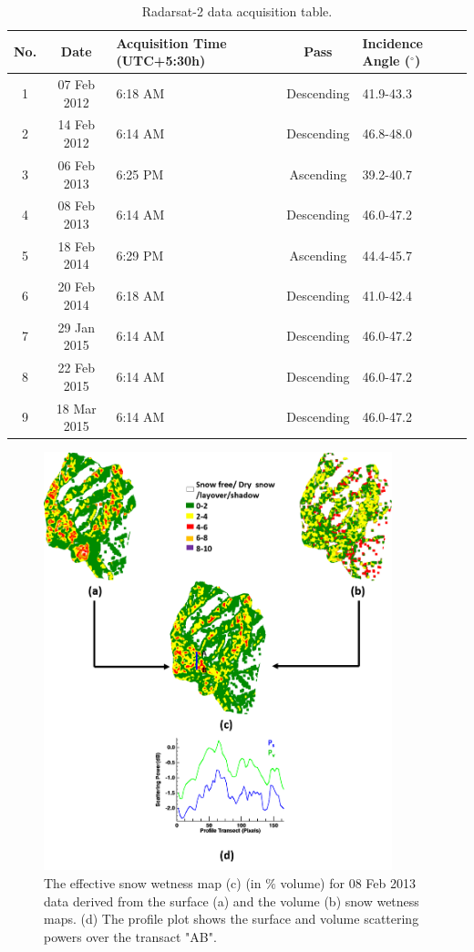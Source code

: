 \begin{table}[!h]
	\caption{Radarsat-2 data acquisition table.}
	\begin{center}
		\begin{tabular}{| c | c | p{3cm} | c | p{2cm} |} \hline
			No. & Date & Acquisition Time (UTC+5:30h) & Pass & Incidence Angle ($^\circ$) \\ \hline \hline
			1 & 07 Feb 2012 & 6:18 AM & Descending & 41.9-43.3\\ \hline
			2 & 14 Feb 2012 & 6:14 AM & Descending & 46.8-48.0\\ \hline
			3 & 06 Feb 2013 & 6:25 PM & Ascending & 39.2-40.7\\ \hline
			4 & 08 Feb 2013 & 6:14 AM & Descending & 46.0-47.2\\ \hline
			5 & 18 Feb 2014 & 6:29 PM & Ascending & 44.4-45.7\\ \hline
			6 & 20 Feb 2014 & 6:18 AM & Descending & 41.0-42.4\\ \hline
			7 & 29 Jan 2015 & 6:14 AM & Descending & 46.0-47.2\\ \hline
			8 & 22 Feb 2015 & 6:14 AM & Descending & 46.0-47.2\\ \hline
			9 & 18 Mar 2015 & 6:14 AM & Descending & 46.0-47.2\\ \hline
		\end{tabular}
	\end{center}
	\label{table:data acquisition}
\end{table}
\begin{figure}[!th]
	\centering
	\includegraphics[width=0.9\textwidth]{Figures/effe_SW.png}
	\caption [Effective Snow wetness map from 08 Feb. 2013 Radarsat-2 data]{The effective snow wetness map (c) (in $\%$ volume) for 08 Feb 2013 data derived from the surface (a) and the volume (b) snow wetness maps. (d) The profile plot shows the surface and volume scattering powers over the transact "AB".}
	\label{fig:effective_snow_wetness_fullpol}
\end{figure}


